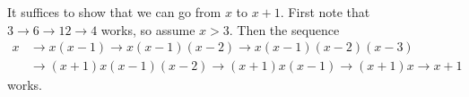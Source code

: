 It suffices to show that we can go from $x$ to $x+1$. First note that $3\to6\to12\to4$ works, so assume $x>3$. Then the sequence
\begin{align*}
	x&\to x(x-1)\to x(x-1)(x-2)\to x(x-1)(x-2)(x-3)\\
	&\to(x+1)x(x-1)(x-2)\to(x+1)x(x-1)\to(x+1)x\to x+1
\end{align*}
works.